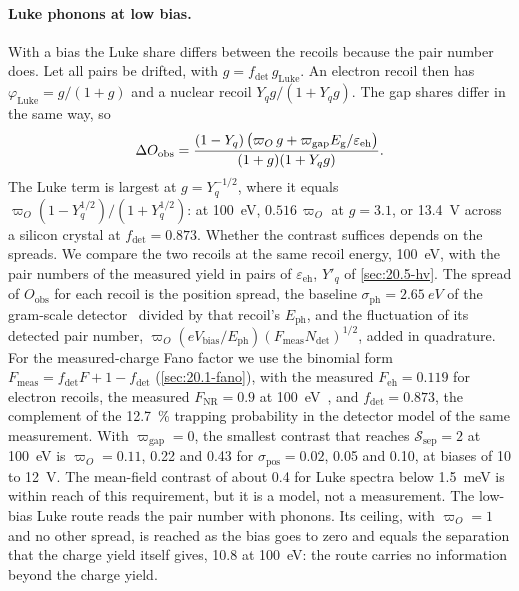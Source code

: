 \paragraph{Luke phonons at low bias.} With a bias the Luke share differs between the recoils because the pair number does. Let all pairs be drifted, with $g = f_{\mathrm{det}}\,g_{\mathrm{Luke}}$. An electron recoil then has $\varphi_{\mathrm{Luke}} = g/(1 + g)$ and a nuclear recoil $Y_qg/(1 + Y_qg)$. The gap shares differ in the same way, so
\begin{equation}
  \Delta O_{\mathrm{obs}} = \frac{(1 - Y_q)\,\bigl(\varpi_O\,g + \varpi_{\mathrm{gap}}E_{\mathrm{g}}/\varepsilon_{\mathrm{eh}}\bigr)}{(1 + g)(1 + Y_qg)} .
  \label{eq:20.5-lowbias}
\end{equation}
The Luke term is largest at $g = Y_q^{-1/2}$, where it equals $\varpi_O(1 - Y_q^{1/2})/(1 + Y_q^{1/2})$: at \SI{100}{eV}, $0.516\,\varpi_O$ at $g = 3.1$, or \SI{13.4}{V} across a silicon crystal at $f_{\mathrm{det}} = 0.873$. Whether the contrast suffices depends on the spreads. We compare the two recoils at the same recoil energy, \SI{100}{eV}, with the pair numbers of the measured yield in pairs of $\varepsilon_{\mathrm{eh}}$, $Y'_q$ of \cref{sec:20.5-hv}. The spread of $O_{\mathrm{obs}}$ for each recoil is the position spread, the baseline $\sigma_{\mathrm{ph}} = \SI{2.65}{eV}$ of the gram-scale detector~\cite{ren2021design} divided by that recoil's $E_{\mathrm{ph}}$, and the fluctuation of its detected pair number, $\varpi_O(eV_{\mathrm{bias}}/E_{\mathrm{ph}})(F_{\mathrm{meas}}N_{\mathrm{det}})^{1/2}$, added in quadrature. For the measured-charge Fano factor we use the binomial form $F_{\mathrm{meas}} = f_{\mathrm{det}}F + 1 - f_{\mathrm{det}}$ (\cref{sec:20.1-fano}), with the measured $F_{\mathrm{eh}} = 0.119$ for electron recoils, the measured $F_{\mathrm{NR}} = 0.9$ at \SI{100}{eV}~\cite[Table~II]{albakry2023first}, and $f_{\mathrm{det}} = 0.873$, the complement of the \SI{12.7}{\percent} trapping probability in the detector model of the same measurement. With $\varpi_{\mathrm{gap}} = 0$, the smallest contrast that reaches $\mathcal{S}_{\mathrm{sep}} = 2$ at \SI{100}{eV} is $\varpi_O = 0.11$, 0.22 and 0.43 for $\sigma_{\mathrm{pos}} = 0.02$, 0.05 and 0.10, at biases of 10 to \SI{12}{V}. The mean-field contrast of about 0.4 for Luke spectra below \SI{1.5}{meV} is within reach of this requirement, but it is a model, not a measurement. The low-bias Luke route reads the pair number with phonons. Its ceiling, with $\varpi_O = 1$ and no other spread, is reached as the bias goes to zero and equals the separation that the charge yield itself gives, 10.8 at \SI{100}{eV}: the route carries no information beyond the charge yield.


